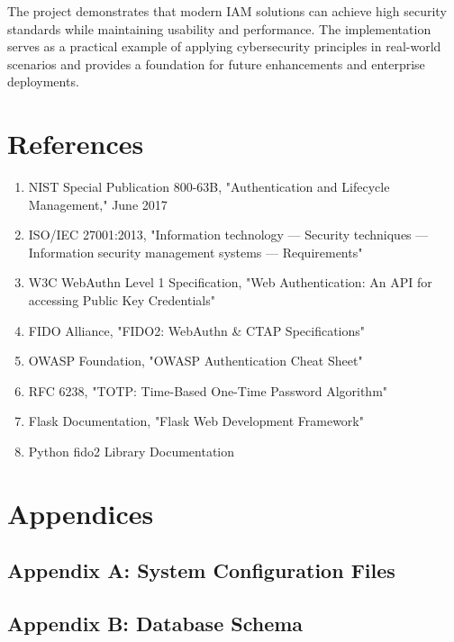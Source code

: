 \documentclass[12pt,a4paper]{article}
\begin{document}
The project demonstrates that modern IAM solutions can achieve high security standards while maintaining usability and performance. The implementation serves as a practical example of applying cybersecurity principles in real-world scenarios and provides a foundation for future enhancements and enterprise deployments.

\section{References}

\begin{enumerate}
    \item NIST Special Publication 800-63B, "Authentication and Lifecycle Management," June 2017
    \item ISO/IEC 27001:2013, "Information technology — Security techniques — Information security management systems — Requirements"
    \item W3C WebAuthn Level 1 Specification, "Web Authentication: An API for accessing Public Key Credentials"
    \item FIDO Alliance, "FIDO2: WebAuthn \& CTAP Specifications"
    \item OWASP Foundation, "OWASP Authentication Cheat Sheet"
    \item RFC 6238, "TOTP: Time-Based One-Time Password Algorithm"
    \item Flask Documentation, "Flask Web Development Framework"
    \item Python fido2 Library Documentation
\end{enumerate}

\section{Appendices}

\subsection{Appendix A: System Configuration Files}


\subsection{Appendix B: Database Schema}

\end{document}
